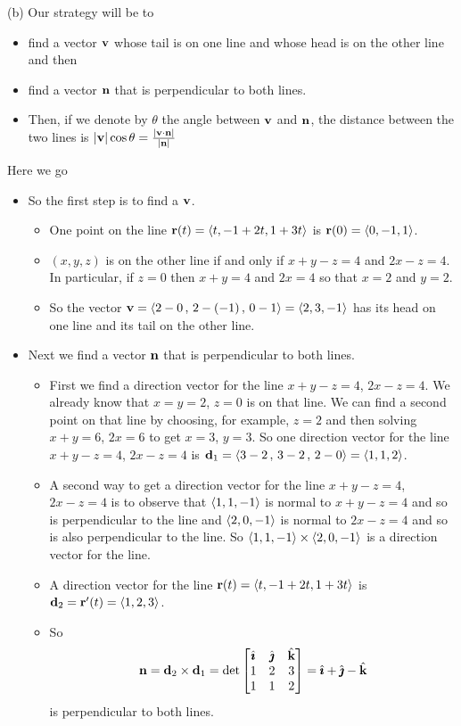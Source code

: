 \begin{solution}
(b) Our strategy will be to
\begin{itemize}
\item
  find a vector $\mathbf{v}$ whose tail is on one line and whose head is on the
  other line and then
\item 
  find a vector $\mathbf{n}$ that is perpendicular to both lines.
\item
  Then, if we denote by $\theta$ the angle between $\mathbf{v}$ and $\mathbf{n}$,
  the distance between the two lines is 
  $|\mathbf{v}|\cos\theta = \frac{|\mathbf{v}\cdot\mathbf{n}|}{|\mathbf{n}|}$
\end{itemize}
Here we go
\begin{itemize}
\item
So the first step is to find a $\mathbf{v}$.
\begin{itemize}
\item 
One point on the line $\mathbf{r}(t)=\left< t, -1+2t, 1+3t\right>$ is 
$\mathbf{r}(0)=\left< 0,-1,1\right>$. 
\item
$(x,y,z)$ is on the other line if and only if $x+y-z=4$ and $2x-z=4$.
In particular, if $z=0$ then $x+y=4$ and $2x=4$ so that $x=2$ and $y=2$.
\item
So the vector $\mathbf{v}=\left< 2-0\,,\,2-(-1)\,,\,0-1\right>=\left< 2,3,-1\right>$
has its head on one line and its tail on the other line.
\end{itemize}
\item
Next we find a vector $\mathbf{n}$ that is perpendicular to both lines.
\begin{itemize} 
\item 
First we find a direction vector for the line $x+y-z=4$, $2x-z=4$.
We already know that $x=y=2$, $z=0$ is on that line. We can find a second point
on that line by choosing, for example, $z=2$ and then solving $x+y=6$, $2x=6$
to get $x=3$, $y=3$.  So one direction vector for the line $x+y-z=4$, $2x-z=4$
is $\mathbf{d}_1=\left<3-2\,,\,3-2\,,\,2-0 \right> = \left< 1,1,2\right>$.
\item 
A second way to get a direction vector for the line $x+y-z=4$, $2x-z=4$
is to observe that $\left< 1,1,-1\right>$ is normal to $x+y-z=4$ and so
is perpendicular to the line and $\left< 2,0,-1\right>$ is normal to $2x-z=4$ 
and so is also perpendicular to the line. 
So $\left< 1,1,-1\right>\times\left< 2,0,-1\right>$ is a direction vector for the line.
\item
A direction vector for the line $\mathbf{r}(t)=\left< t, -1+2t, 1+3t\right>$ is $\mathbf{d}_2=\mathbf{r}'(t)=\left< 1,2,3\right>$.
\item 
So 
\begin{equation*}
\mathbf{n}=\mathbf{d}_2\times\mathbf{d}_1
=\det\left[\begin{matrix}
                     \hat{\pmb{\imath}} & \hat{\pmb{\jmath}} & \hat{\mathbf{k}} \\
                     1   &  2  & 3 \\
                     1   &  1  & 2
                \end{matrix}\right]
= \hat{\pmb{\imath}} + \hat{\pmb{\jmath}} -\hat{\mathbf{k}} 
\end{equation*}
is perpendicular to both lines.
\end{itemize}


\end{itemize}
\end{solution}
